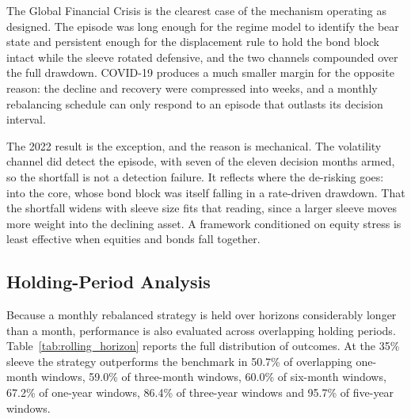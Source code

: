 \documentclass[11pt, a4paper]{article}
\begin{document}
The Global Financial Crisis is the clearest case of the mechanism operating as designed. The
episode was long enough for the regime model to identify the bear state and persistent enough
for the displacement rule to hold the bond block intact while the sleeve rotated defensive,
and the two channels compounded over the full drawdown. COVID-19 produces a much smaller
margin for the opposite reason: the decline and recovery were compressed into weeks, and a
monthly rebalancing schedule can only respond to an episode that outlasts its decision
interval.

The 2022 result is the exception, and the reason is mechanical. The volatility channel did
detect the episode, with seven of the eleven decision months armed, so the shortfall is not a
detection failure. It reflects where the de-risking goes: into the core, whose bond block was
itself falling in a rate-driven drawdown. That the shortfall widens with sleeve size fits that
reading, since a larger sleeve moves more weight into the declining asset. A framework
conditioned on equity stress is least effective when equities and bonds fall together.

\subsection{Holding-Period Analysis}

Because a monthly rebalanced strategy is held over horizons considerably longer than a month,
performance is also evaluated across overlapping holding periods.
Table~\ref{tab:rolling_horizon} reports the full distribution of outcomes. At the 35\% sleeve
the strategy outperforms the benchmark in 50.7\% of overlapping one-month windows, 59.0\% of
three-month windows, 60.0\% of six-month windows, 67.2\% of one-year windows, 86.4\% of
three-year windows and 95.7\% of five-year windows.
\end{document}
